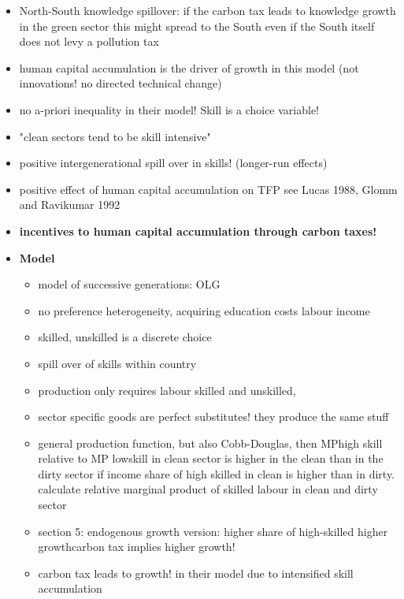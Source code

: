 \begin{itemize}
\begin{itemize}
		\item North-South knowledge spillover: if the carbon tax leads to knowledge growth in the green sector this might spread to the South even if the South itself does not levy a pollution tax
		\item human capital accumulation is the driver of growth in this model (not innovations! no directed technical change)
		\item no a-priori inequality in their model! Skill is a choice variable! 
		\item "clean sectors  tend to be skill intensive"
		\item positive intergenerational spill over in skills! (longer-run effects)
		\item positive effect of human capital accumulation on TFP see Lucas 1988, Glomm and Ravikumar 1992
		\item \textbf{incentives to human capital accumulation through carbon taxes!}
		\item \textbf{Model}
		\begin{itemize}
			\item model of successive generations: OLG
			\item no preference heterogeneity, acquiring education costs labour income
			\item skilled, unskilled is a discrete choice
			\item spill over of skills within country
			\item production only requires labour skilled and unskilled,
			\item sector specific goods are perfect substitutes! they produce the same stuff
			\item general production function, but also Cobb-Douglas, then MPhigh skill relative to MP lowskill in clean sector is higher in the clean than in the dirty sector if income share of high skilled in clean is higher than in dirty. \ar calculate relative marginal product of skilled labour in clean and dirty sector
			\item section 5: endogenous growth version: higher share of high-skilled \ar higher growth\ar carbon tax implies higher growth!
			\item carbon tax leads to growth! in their model due to intensified skill accumulation
		\end{itemize}
	\end{itemize}
	

\end{itemize}
